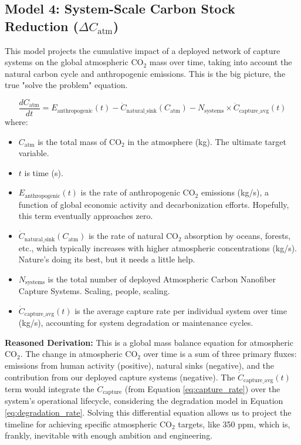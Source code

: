 \documentclass[12pt]{article}
\begin{document}
\subsection*{Model 4: System-Scale Carbon Stock Reduction (\(\Delta C_{\text{atm}}\))}
This model projects the cumulative impact of a deployed network of capture systems on the global atmospheric CO\(_2\) mass over time, taking into account the natural carbon cycle and anthropogenic emissions. This is the big picture, the true "solve the problem" equation.

\begin{equation}
\frac{dC_{\text{atm}}}{dt} = E_{\text{anthropogenic}}(t) - \dot{C}_{\text{natural\_sink}}(C_{\text{atm}}) - N_{\text{systems}} \times \dot{C}_{\text{capture\_avg}}(t)
\label{eq:global_impact}
\end{equation}
where:
\begin{itemize}
    \item \(C_{\text{atm}}\) is the total mass of CO\(_2\) in the atmosphere (kg). The ultimate target variable.
    \item \(t\) is time (s).
    \item \(E_{\text{anthropogenic}}(t)\) is the rate of anthropogenic CO\(_2\) emissions (kg/s), a function of global economic activity and decarbonization efforts. Hopefully, this term eventually approaches zero.
    \item \(\dot{C}_{\text{natural\_sink}}(C_{\text{atm}})\) is the rate of natural CO\(_2\) absorption by oceans, forests, etc., which typically increases with higher atmospheric concentrations (kg/s). Nature's doing its best, but it needs a little help.
    \item \(N_{\text{systems}}\) is the total number of deployed Atmospheric Carbon Nanofiber Capture Systems. Scaling, people, scaling.
    \item \(\dot{C}_{\text{capture\_avg}}(t)\) is the average capture rate per individual system over time (kg/s), accounting for system degradation or maintenance cycles.
\end{itemize}

\textbf{Reasoned Derivation:} This is a global mass balance equation for atmospheric CO\(_2\). The change in atmospheric CO\(_2\) over time is a sum of three primary fluxes: emissions from human activity (positive), natural sinks (negative), and the contribution from our deployed capture systems (negative). The \(\dot{C}_{\text{capture\_avg}}(t)\) term would integrate the \(\dot{C}_{\text{capture}}\) (from Equation \ref{eq:capture_rate}) over the system's operational lifecycle, considering the degradation model in Equation \ref{eq:degradation_rate}. Solving this differential equation allows us to project the timeline for achieving specific atmospheric CO\(_2\) targets, like 350 ppm, which is, frankly, inevitable with enough ambition and engineering.
\end{document}
